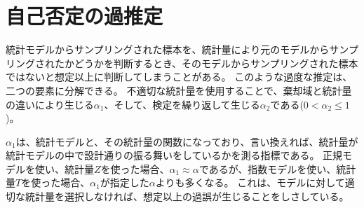     


\section{自己否定の過推定}
統計モデルからサンプリングされた標本を、統計量により元のモデルからサンプリングされたかどうかを判断するとき、そのモデルからサンプリングされた標本ではないと想定以上に判断してしまうことがある。
このような過度な推定は、二つの要素に分解できる。
不適切な統計量を使用することで、棄却域と統計量の違いにより生じる$\alpha_1$、そして、検定を繰り返して生じる$\alpha_2$である($0<\alpha_2 \leq 1$)。

$\alpha_1$は、統計モデルと、その統計量の関数になっており、言い換えれば、統計量が統計モデルの中で設計通りの振る舞いをしているかを測る指標である。
正規モデルを使い、統計量$Z$を使った場合、$\alpha_1 \approx	 \alpha $であるが、指数モデルを使い、統計量$T$を使った場合、$\alpha_1$が指定した$\alpha$よりも多くなる。
これは、モデルに対して適切な統計量を選択しなければ、想定以上の過誤が生じることをしさしている。








